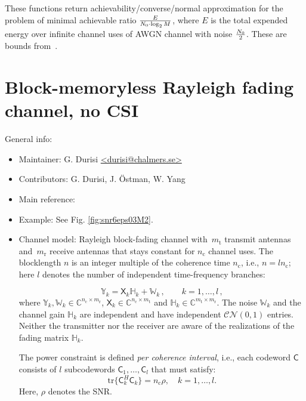 \documentclass[a4paper,11p]{memoir}
\def\txant{m_{\mathrm{t}}} %
\def\rxant{m_{\mathrm{r}}} %
\def\cohtime{n_{\mathrm{c}}} %
\def\bl{n} %
\def\snr{\rho} %
\def\tfdiv{l}  %
\def\tr{\mathrm{tr}}
\begin{document}
These functions return achievability/converse/normal approximation for the problem of minimal achievable ratio ${E\over
N_0 \cdot \log_2 M}$, where $E$ is the total expended energy over infinite channel uses of AWGN channel with noise
$N_0\over 2$.  These are bounds from~\cite[Theorems 2 and 3]{PPV10eneff}.

\chapter[Block-memoryless Rayleigh fading (no CSI)]{Block-memoryless Rayleigh fading channel, no CSI}

General info:
\begin{itemize}
  \item Maintainer: G. Durisi \url{<durisi@chalmers.se>}
  
  \item Contributors: G. Durisi, J. \"Ostman, W. Yang

  \item Main reference: \cite{durisi14-12a} 

  \item Example: See Fig. \ref{fig:snr6eps03M2}.
  
  \item Channel model: Rayleigh block-fading channel with~$\txant$ 
  transmit antennas and~$\rxant$ receive antennas that stays constant for
   $\cohtime$ channel uses.
  The blocklength $\bl$ is an integer multiple of the coherence time $\cohtime$, i.e., $\bl=\tfdiv\cohtime$; here
  $\tfdiv$ denotes the number of independent time-frequency branches:
  
  \begin{equation}\label{eq:bfmimo}
  	\mathbb{Y}_k = \mathsf{X}_k \mathbb{H}_k + \mathbb{W}_k\,, \qquad k=1,\ldots, \tfdiv\,,
\end{equation}  
  where $\mathbb{Y}_k, \mathbb{W}_k \in \mathbb{C}^{\cohtime \times \rxant}$, $\mathsf{X}_k \in \mathbb{C}^{\cohtime \times
  \txant}$ and $\mathbb{H}_k\in\mathbb{C}^{\txant \times \rxant}$. The noise $\mathbb{W}_k$ and the channel gain
  $\mathbb{H}_k$ are independent and have independent $\mathcal{CN}(0,1)$ entries.
  Neither the transmitter nor the receiver are aware of the realizations of the fading matrix $\mathbb{H}_k$.


  The power constraint is defined \textit{per coherence interval}, i.e., each codeword $\mathsf{C}$  consists of $\tfdiv$ subcodewords $\mathsf{C}_1,\ldots, \mathsf{C}_\tfdiv$ that must
  satisfy:
    \begin{equation*}
      \tr\bigl\{\mathsf{C}_{k}^H \mathsf{C}_{k}\bigr\}= \cohtime\snr,\quad  k=1,\dots,\tfdiv. 
    \end{equation*}
    Here, $\snr$ denotes the SNR. 


\end{itemize}
\end{document}
